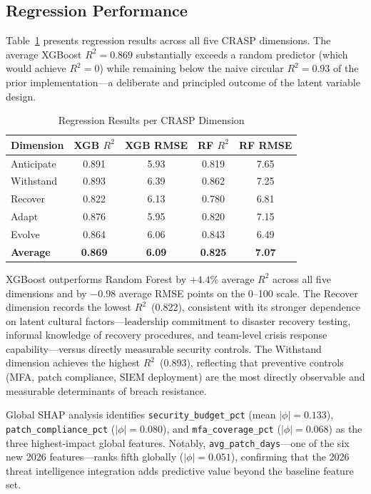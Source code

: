 \documentclass[journal]{IEEEtran}
\begin{document}
\subsection{Regression Performance}

Table~\ref{tab:regress} presents regression results across all five CRASP
dimensions. The average XGBoost $R^2 = 0.869$ substantially exceeds a
random predictor (which would achieve $R^2 = 0$) while remaining below the
naive circular $R^2 = 0.93$ of the prior implementation---a deliberate and
principled outcome of the latent variable design.

\begin{table}[!t]
\renewcommand{\arraystretch}{1.3}
\caption{Regression Results per CRASP Dimension}
\label{tab:regress}
\centering
\begin{tabular}{lcccc}
\toprule
\textbf{Dimension} & \textbf{XGB $R^2$} & \textbf{XGB RMSE} & \textbf{RF $R^2$} & \textbf{RF RMSE} \\
\midrule
Anticipate & 0.891 & 5.93 & 0.819 & 7.65 \\
Withstand  & 0.893 & 6.39 & 0.862 & 7.25 \\
Recover    & 0.822 & 6.13 & 0.780 & 6.81 \\
Adapt      & 0.876 & 5.95 & 0.820 & 7.15 \\
Evolve     & 0.864 & 6.06 & 0.843 & 6.49 \\
\midrule
\textbf{Average} & \textbf{0.869} & \textbf{6.09} & \textbf{0.825} & \textbf{7.07} \\
\bottomrule
\end{tabular}
\end{table}

XGBoost outperforms Random Forest by $+4.4$\% average $R^2$ across all five
dimensions and by $-0.98$ average RMSE points on the 0--100 scale. The
Recover dimension records the lowest $R^2$~(0.822), consistent with its
stronger dependence on latent cultural factors---leadership commitment to
disaster recovery testing, informal knowledge of recovery procedures, and
team-level crisis response capability---versus directly measurable security
controls. The Withstand dimension achieves the highest $R^2$~(0.893),
reflecting that preventive controls (MFA, patch compliance, SIEM deployment)
are the most directly observable and measurable determinants of breach
resistance.

Global SHAP analysis identifies
\texttt{security\_budget\_pct} (mean $|\phi|=0.133$),
\texttt{patch\_compliance\_pct} ($|\phi|=0.080$), and
\texttt{mfa\_coverage\_pct} ($|\phi|=0.068$) as the three highest-impact
global features. Notably, \texttt{avg\_patch\_days}---one of the six new
2026 features---ranks fifth globally ($|\phi|=0.051$), confirming that the
2026 threat intelligence integration adds predictive value beyond the
baseline feature set.
\end{document}

